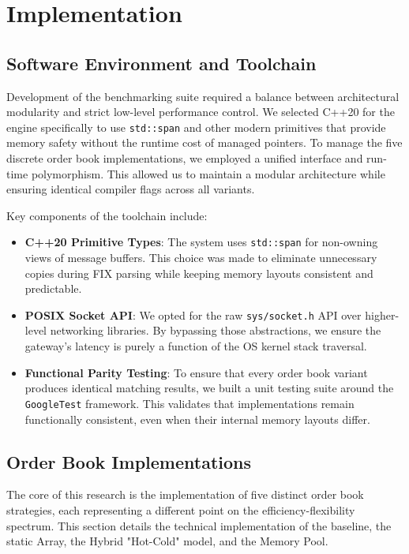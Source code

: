 \chapter{Implementation}
\label{chap:implementation}

\section{Software Environment and Toolchain}
Development of the benchmarking suite required a balance between 
architectural modularity and strict low-level performance control. 
We selected C++20 for the engine specifically to use \texttt{std::span} 
and other modern primitives that provide memory safety without the runtime 
cost of managed pointers. 
To manage the five discrete order book implementations, we employed a 
unified interface and run-time polymorphism. This allowed us to maintain 
a modular architecture while ensuring identical compiler flags across 
all variants. 

Key components of the toolchain include:
\begin{itemize}
    \item \textbf{C++20 Primitive Types}: The system uses \texttt{std::span} 
    for non-owning views of message buffers. This choice was made to 
    eliminate unnecessary copies during FIX parsing while keeping 
    memory layouts consistent and predictable.
    \item \textbf{POSIX Socket API}: We opted for the raw \texttt{sys/socket.h} API over higher-level networking 
libraries. 
By bypassing those abstractions, we ensure the gateway's latency is purely a 
function of the OS kernel stack traversal.
    \item \textbf{Functional Parity Testing}: To ensure that every order book variant produces identical matching results, 
we built a unit testing suite around the \texttt{GoogleTest} framework. 
This validates that implementations remain functionally consistent, even 
when their internal memory layouts differ.
\end{itemize}

\section{Order Book Implementations}
The core of this research is the implementation of five distinct order book 
strategies, each representing a different point on the efficiency-flexibility 
spectrum. This section details the technical implementation of the 
baseline, the static Array, the Hybrid "Hot-Cold" model, and the Memory Pool.

